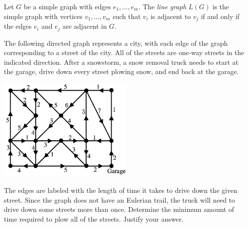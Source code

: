 \documentclass{exam}
\newcommand{\lst}[2]{#1_1,\dots,#1_{#2}}
\begin{document}
\begin{questions}
	\question[36]  Let $G$ be a simple graph with edges $\lst e m$. The {\it line graph} $L(G)$ is the simple graph with vertices $\lst v m$ such that $v_i$ is adjacent to $v_j$ if and only if the edges $e_i$ and $e_j$ are adjacent in $G$.

	\question[20] The following directed graph represents a city, with each edge of the graph corresponding to a street of the city. All of the streets are one-way streets in the indicated direction. After a snowstorm, a snow removal truck needs to start at the garage, drive down every street plowing snow, and end back at the garage.
	\begin{center}
			\includegraphics[width=0.5\textwidth]{mtpic2.png}
	\end{center}
	The edges are labeled with the length of time it takes to drive down the given street. Since the graph does not have an Eulerian trail, the truck will need to drive down some streets more than once. Determine the minimum amount of time required to plow all of the streets. Justify your answer.


\end{questions}
\end{document}
